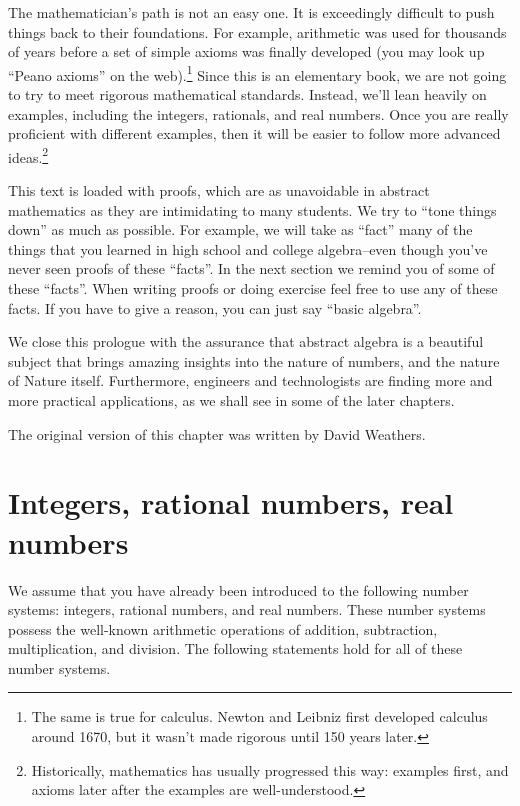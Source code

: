 The mathematician's path is not an easy one. It is exceedingly  difficult to push things back to their foundations. For example, arithmetic was used for thousands of years before a set of simple axioms was finally developed (you may look up ``Peano axioms'' on the web).\footnote{The same is true for calculus. Newton and Leibniz first developed calculus around 1670, but it wasn't made rigorous until 150 years later.}
Since this is an elementary book, we are not going to try to meet rigorous mathematical standards. Instead, we'll lean heavily on examples, including the integers, rationals, and real numbers. Once you are really proficient with different examples, then it will be easier to follow more advanced ideas.\footnote{Historically, mathematics has usually progressed this way: examples first, 
and axioms later after the examples are well-understood.}

This text is loaded with proofs, which are as unavoidable in abstract mathematics as they are intimidating to many students. We try to ``tone things down'' as much as possible. For example, we will take as ``fact'' many of the things that you learned in high school and  college algebra--even though you've never seen proofs of these ``facts''.  In the next section  we remind you of some of these ``facts''.  When writing proofs or doing exercise feel free to use any of these facts.  If you have to give a reason, you can just say  ``basic algebra''.

We close this prologue with the assurance that abstract algebra is a beautiful subject that brings amazing insights into the nature of numbers, and the nature of Nature itself. Furthermore, engineers and technologists are finding more and more practical applications, as we shall see in some of the later chapters.

The original version of this chapter was written by David Weathers. 

\section{Integers, rational numbers, real numbers}
\label{sec:IntegersRationalRealNumbers}


We assume that you have already been introduced to the following number systems: integers, rational numbers, and real numbers.  These number systems possess the well-known arithmetic operations of addition, subtraction, multiplication, and division. The following statements hold for all of these number systems. 

